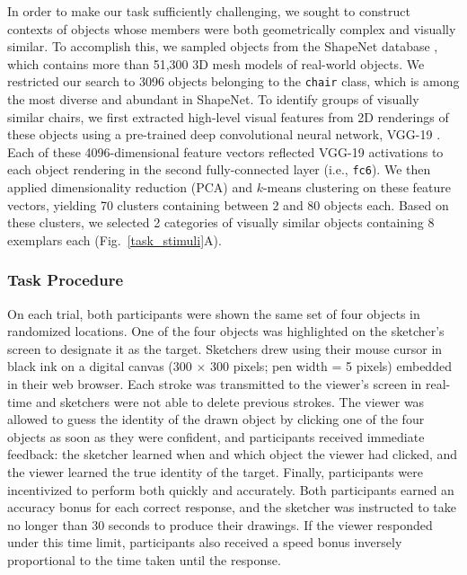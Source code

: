 \documentclass[10pt,letterpaper]{article}
\begin{document}
In order to make our task sufficiently challenging, we sought to construct contexts of objects whose members were both geometrically complex and visually similar.
To accomplish this, we sampled objects from the ShapeNet database \cite{chang2015shapenet}, which contains more than 51,300 3D mesh models of real-world objects. %
We restricted our search to 3096 objects belonging to the \texttt{chair} class, which is among the most diverse and abundant in ShapeNet.
To identify groups of visually similar chairs, we first extracted high-level visual features from 2D renderings of these objects using a pre-trained deep convolutional neural network, VGG-19 \cite{simonyan2014very}.
Each of these 4096-dimensional feature vectors reflected VGG-19 activations to each object rendering in the second fully-connected layer (i.e., \texttt{fc6}).
We then applied dimensionality reduction (PCA) and $k$-means clustering on these feature vectors, yielding 70 clusters containing between 2 and 80 objects each.
Based on these clusters, we selected 2 categories of visually similar objects containing 8 exemplars each (Fig.~\ref{task_stimuli}A).

\subsubsection{Task Procedure}

On each trial, both participants were shown the same set of four objects in randomized locations.
One of the four objects was highlighted on the sketcher's screen to designate it as the target.
Sketchers drew using their mouse cursor in black ink on a digital canvas (300 $\times$ 300 pixels; pen width = 5 pixels) embedded in their web browser.
Each stroke was transmitted to the viewer's screen in real-time and sketchers were not able to delete previous strokes.
The viewer was allowed to guess the identity of the drawn object by clicking one of the four objects as soon as they were confident, and participants received immediate feedback: the sketcher learned when and which object the viewer had clicked, and the viewer learned the true identity of the target.
Finally, participants were incentivized to perform both quickly and accurately.
Both participants earned an accuracy bonus for each correct response, and the sketcher was instructed to take no longer than 30 seconds to produce their drawings.
If the viewer responded under this time limit, participants also received a speed bonus inversely proportional to the time taken until the response.
\end{document}
